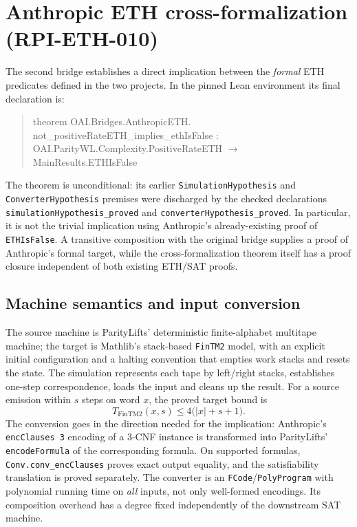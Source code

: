 \documentclass[11pt,letterpaper]{article}
\newcommand{\lean}[1]{\texttt{#1}}
\begin{document}
\section{Anthropic ETH cross-formalization (RPI-ETH-010)}\label{sec:anthropic}
The second bridge establishes a direct implication between the \emph{formal} ETH predicates defined in the two projects. In the pinned Lean environment its final declaration is:
\begin{quote}\small\ttfamily
 theorem OAI.Bridges.AnthropicETH.\\
 \quad not\_positiveRateETH\_implies\_ethIsFalse :\\
 \quad\textlnot{} OAI.ParityWL.Complexity.PositiveRateETH $\to$\\
 \qquad MainResults.ETHIsFalse
\end{quote}
The theorem is unconditional: its earlier \lean{SimulationHypothesis} and \lean{ConverterHypothesis} premises were discharged by the checked declarations \lean{simulationHypothesis\_proved} and \lean{converterHypothesis\_proved}. In particular, it is not the trivial implication using Anthropic's already-existing proof of \lean{ETHIsFalse}. A transitive composition with the original bridge supplies a proof of Anthropic's formal target, while the cross-formalization theorem itself has a proof closure independent of both existing ETH/SAT proofs.

\subsection{Machine semantics and input conversion}
The source machine is ParityLifts' deterministic finite-alphabet multitape machine; the target is Mathlib's stack-based \lean{FinTM2} model, with an explicit initial configuration and a halting convention that empties work stacks and resets the state. The simulation represents each tape by left/right stacks, establishes one-step correspondence, loads the input and cleans up the result. For a source emission within $s$ steps on word $x$, the proved target bound is
\begin{equation}
T_{\mathrm{FinTM2}}(x,s)\le 4\bigl(|x|+s+1\bigr).
\end{equation}
The conversion goes in the direction needed for the implication: Anthropic's \lean{encClauses 3} encoding of a 3-CNF instance is transformed into ParityLifts' \lean{encodeFormula} of the corresponding formula. On supported formulas, \lean{Conv.conv\_encClauses} proves exact output equality, and the satisfiability translation is proved separately. The converter is an \lean{FCode}/\lean{PolyProgram} with polynomial running time on \emph{all} inputs, not only well-formed encodings. Its composition overhead has a degree fixed independently of the downstream SAT machine.
\end{document}
